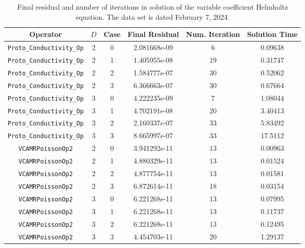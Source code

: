 \documentclass{article}
\begin{document}
\begin{small}
\begin{table}
\begin{center}
\begin{tabular}{|c|c|c|c|c||c|} \hline
 Operator                   & $D$ & Case & Final Residual &
 Num. Iteration & Solution Time\\
\hline
 {\tt Proto\_Conductivity\_Op}    & 2   & 0    & 2.081668e-09   & 6    & 0.09638\\
 {\tt Proto\_Conductivity\_Op}    & 2   & 1    & 1.405955e-08   & 19   & 0.31747\\
 {\tt Proto\_Conductivity\_Op}    & 2   & 2    & 1.584777e-07   & 30   & 0.52062\\
 {\tt Proto\_Conductivity\_Op}    & 2   & 3    & 6.366663e-07   & 30   & 0.67664\\
 {\tt Proto\_Conductivity\_Op}    & 3   & 0    & 4.222235e-09   & 7    & 1.08044\\
 {\tt Proto\_Conductivity\_Op}    & 3   & 1    & 4.702191e-08   & 20   & 3.40413\\
 {\tt Proto\_Conductivity\_Op}    & 3   & 2    & 2.160337e-07   & 33   & 5.83492\\
 {\tt Proto\_Conductivity\_Op}    & 3   & 3    & 8.665997e-07   & 33   & 17.5112\\
\hline                                                     
 {\tt VCAMRPoissonOp2}            & 2   & 0    & 3.941292e-11   & 13   & 0.00963\\
 {\tt VCAMRPoissonOp2}            & 2   & 1    & 4.880329e-11   & 13   & 0.01524\\
 {\tt VCAMRPoissonOp2}            & 2   & 2    & 4.877754e-11   & 13   & 0.01581\\
 {\tt VCAMRPoissonOp2}            & 2   & 3    & 6.872614e-11   & 18   & 0.03154\\
 {\tt VCAMRPoissonOp2}            & 3   & 0    & 6.221268e-11   & 13   & 0.07995\\
 {\tt VCAMRPoissonOp2}            & 3   & 1    & 6.221268e-11   & 13   & 0.11737\\
 {\tt VCAMRPoissonOp2}            & 3   & 2    & 6.221268e-11   & 13   & 0.12495\\
 {\tt VCAMRPoissonOp2}            & 3   & 3    & 4.454703e-11   & 20   & 1.29137\\
\hline
\end{tabular}
\end{center}
\label{tab::conductivity}
\caption
    {
      Final residual and number of iterations in solution of the variable
      coefficient Helmholtz equation.
      The data set is dated February 7, 2024.
    }
\end{table}
\end{small}
\end{document}
